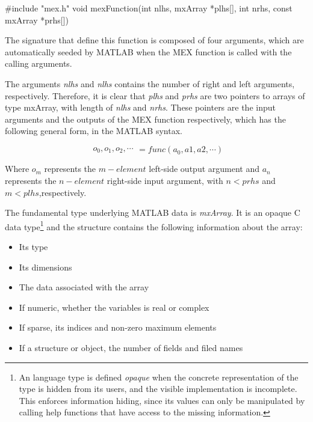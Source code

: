 \documentclass[12pt,a4paper]{extarticle}
\newcommand{\linespace}{\vspace{8pt}}
\begin{document}
\begin{cpp}[caption={MEX functions C/C++ entry point definition},label=code:mexfunction]
#include "mex.h"
void mexFunction(int nlhs, mxArray *plhs[], int nrhs, 
	const mxArray *prhs[])
\end{cpp}

The signature that define this function is composed of four arguments, which are automatically seeded by MATLAB when the MEX function is called with the calling arguments.

The arguments \textit{nlhs} and \textit{nlhs} contains the number of right and left arguments, respectively. Therefore, it is clear that \textit{plhs} and \textit{prhs} are two pointers to arrays of type mxArray, with length of \textit{nlhs} and \textit{nrhs}. These pointers are the input arguments and the outputs of the MEX function respectively, which has the following general form, in the MATLAB syntax.

\[
\begin{matrix}
o_{0},o_{1},o_{2}, \cdots
\end{matrix}
= func (a_{0}, a{1},a{2}, \cdots )
\]

Where $o_{m}$ represents the $m-element$ left-side output argument and $a_{n}$ represents the $n-element$ right-side input argument, with $n < prhs$ and $m < plhs$,respectively.
\linespace

The fundamental type underlying MATLAB data is \textit{mxArray}. It is an opaque C data type\footnote{An language type is defined \textit{opaque} when the concrete representation of the type is hidden from its users, and the visible implementation is incomplete. This enforces information hiding, since its values can only be manipulated by calling help functions that have access to the missing information.} and the structure contains the following information about the array:

\begin{itemize}
\item Its type
\item Its dimensions
\item The data associated with the array
\item If numeric, whether the variables is real or complex
\item If sparse, its indices and non-zero maximum elements
\item If a structure or object, the number of fields and filed names
\end{itemize}
\linespace
\end{document}
